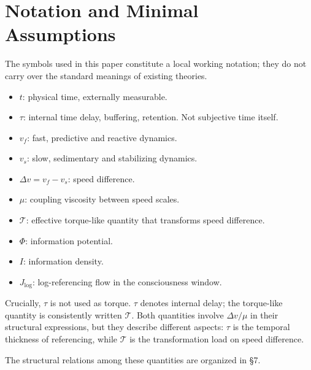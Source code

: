 \section{Notation and Minimal Assumptions}


The symbols used in this paper constitute a local working notation; they do not carry over the standard meanings of existing theories.

\begin{itemize}
\item $t$: physical time, externally measurable.
\item $\tau$: internal time delay, buffering, retention. Not subjective time itself.
\item $v_f$: fast, predictive and reactive dynamics.
\item $v_s$: slow, sedimentary and stabilizing dynamics.
\item $\Delta v = v_f - v_s$: speed difference.
\item $\mu$: coupling viscosity between speed scales.
\item $\mathcal{T}$: effective torque-like quantity that transforms speed difference.
\item $\Phi$: information potential.
\item $I$: information density.
\item $J_{\log}$: log-referencing flow in the consciousness window.
\end{itemize}

Crucially, $\tau$ is not used as torque. $\tau$ denotes internal delay; the torque-like quantity is consistently written $\mathcal{T}$. Both quantities involve $\Delta v/\mu$ in their structural expressions, but they describe different aspects: $\tau$ is the temporal thickness of referencing, while $\mathcal{T}$ is the transformation load on speed difference.

The structural relations among these quantities are organized in §7.
